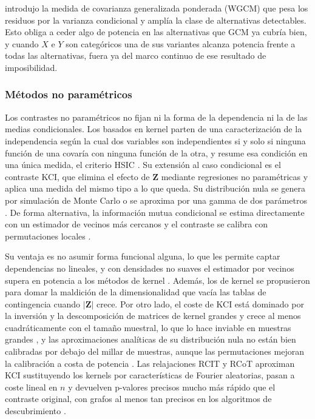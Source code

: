 
\citet{scheidegger2022weighted} introdujo la medida de covarianza generalizada
ponderada (WGCM) que pesa los residuos por la varianza condicional y amplía la clase de
alternativas detectables. Esto obliga a ceder algo de potencia en las alternativas que GCM ya cubría bien, y cuando $X$ e $Y$ son categóricos una de sus variantes alcanza potencia frente a
todas las alternativas, fuera ya del marco continuo de ese resultado de imposibilidad.

\subsubsection{Métodos no paramétricos}           %

Los contrastes no paramétricos no fijan ni la forma de la dependencia ni la de las medias
condicionales. Los basados en kernel parten de una caracterización de la independencia según la
cual dos variables son independientes si y solo si ninguna función de una covaría con ninguna función de la otra, y resume esa condición en una única medida, el criterio HSIC
\citep{gretton2005measuring}. Su extensión al caso condicional es el contraste KCI, que elimina el efecto de $\mathbf{Z}$ mediante regresiones no paramétricas y aplica una medida del mismo tipo a lo que queda. Su distribución nula se genera por simulación de Monte
Carlo o se aproxima por una gamma de dos parámetros \citep{zhang2011kci}. De forma alternativa, la información mutua condicional se estima directamente con un estimador de
vecinos más cercanos y el contraste se calibra con permutaciones locales \citep{runge2018conditional}.

Su ventaja es no asumir forma funcional alguna, lo que les permite captar dependencias no
lineales, y con densidades no suaves el estimador por vecinos supera en potencia a los
métodos de kernel \citep{runge2018conditional}. Además, los de kernel se propusieron para domar la maldición de la dimensionalidad que vacía las tablas de contingencia cuando $|\mathbf{Z}|$ crece.  Por otro lado, el coste de KCI está dominado por la inversión y la descomposición de matrices de kernel grandes y crece al menos cuadráticamente con el tamaño muestral, lo que lo hace inviable en muestras grandes \citep{strobl2019approximate}, y las aproximaciones analíticas de su distribución nula no están bien calibradas por debajo del millar de muestras, aunque las permutaciones
mejoran la calibración a costa de potencia \citep{runge2018conditional}. Las relajaciones RCIT y
RCoT aproximan KCI sustituyendo los kernels por características de Fourier aleatorias,
pasan a coste lineal en $n$ y devuelven p-valores precisos mucho más rápido que el
contraste original, con grafos al menos tan precisos en los algoritmos de descubrimiento
\citep{strobl2019approximate}.


